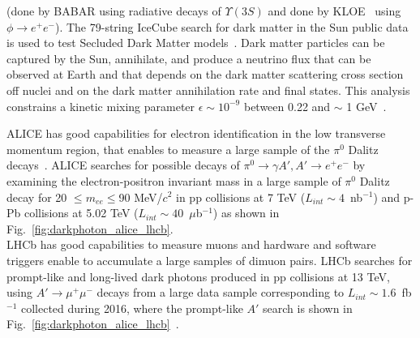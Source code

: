 \documentclass[../report.tex]{subfiles}
\providecommand{\main}{..}
\begin{document}
(done by BABAR using radiative decays of $\Upsilon(3S)$ and 
done by KLOE~\cite{Archilli:2011zc} using $\phi \rightarrow e^+e^-$).
%
The 79-string IceCube search for dark matter in the Sun public data is 
used to test Secluded Dark Matter models~\cite{Ardid:2017lry}. 
Dark matter particles can be captured by the Sun, annihilate, and 
produce a neutrino flux that can be observed at Earth and that 
depends on the dark matter scattering cross section off nuclei
and on the dark matter annihilation rate and final states.
This analysis constrains a kinetic mixing parameter $\epsilon \sim 10^{-9}$
between 0.22 and $\sim$ 1 GeV~\cite{Ardid:2017lry}.


ALICE has good capabilities for electron identification in the low 
transverse momentum region, that enables to measure a large sample of 
the $\pi^0$ Dalitz decays~\cite{Acharya:2018ohw}. 
ALICE searches for possible decays of 
$\pi^0 \rightarrow \gamma A', A' \rightarrow e^+e^-$ 
by examining the electron-positron invariant mass in a large sample
of $\pi^0$ Dalitz decay for 20 $\le m_{ee} \le $90 MeV/$c^2$ in 
pp collisions at 7 TeV ($L_{int} \sim 4$~nb$^{-1}$) and 
p-Pb collisions at 5.02 TeV ($L_{int} \sim 40$~$\mu$b$^{-1}$) as shown in 
Fig.~\ref{fig:darkphoton_alice_lhcb}.\\
LHCb has good capabilities to measure muons and hardware and software 
triggers enable to accumulate a large samples of dimuon pairs. 
LHCb searches for prompt-like and long-lived dark photons 
produced in pp collisions at 13 TeV, using $A' \rightarrow \mu^+\mu^-$ decays 
from a large data sample corresponding to $L_{int} \sim 1.6$~fb$^{-1}$ 
collected during 2016, where 
the prompt-like $A'$ search is shown in Fig.~\ref{fig:darkphoton_alice_lhcb}~\cite{Aaij:2017rft}.
\end{document}
